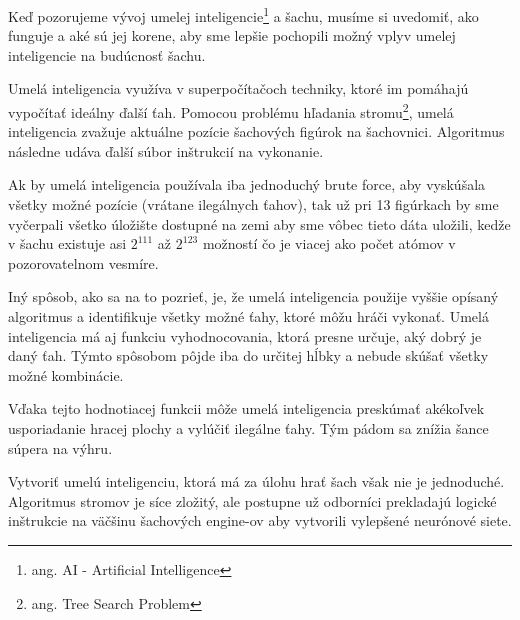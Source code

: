 \documentclass[10pt,oneside,slovak,a4paper]{article}
\begin{document}
Keď pozorujeme vývoj umelej inteligencie\footnote{ang. AI - Artificial Intelligence} a šachu, musíme si uvedomiť, ako funguje a aké sú jej korene, aby sme lepšie pochopili možný vplyv umelej inteligencie na budúcnosť šachu.

Umelá inteligencia využíva v superpočítačoch techniky, ktoré im pomáhajú vypočítať ideálny ďalší ťah. Pomocou problému hľadania stromu\footnote{ang. Tree Search Problem}, umelá inteligencia zvažuje aktuálne pozície šachových figúrok na šachovnici. Algoritmus následne udáva ďalší súbor inštrukcií na vykonanie.

Ak by umelá inteligencia používala iba jednoduchý brute force, aby vyskúšala všetky možné pozície (vrátane ilegálnych ťahov), tak už pri 13 figúrkach by sme vyčerpali všetko úložište dostupné na zemi aby sme vôbec tieto dáta uložili, kedže v šachu existuje asi $2^{111}$ až $2^{123}$ možností čo je viacej ako počet atómov v pozorovatelnom vesmíre.

Iný spôsob, ako sa na to pozrieť, je, že umelá inteligencia použije vyššie opísaný algoritmus a identifikuje všetky možné ťahy, ktoré môžu hráči vykonať. Umelá inteligencia má aj funkciu vyhodnocovania, ktorá presne určuje, aký dobrý je daný ťah. Týmto spôsobom pôjde iba do určitej hĺbky a nebude skúšať všetky možné kombinácie.

Vďaka tejto hodnotiacej funkcii môže umelá inteligencia preskúmať akékoľvek usporiadanie hracej plochy a vylúčiť ilegálne ťahy. Tým pádom sa znížia šance súpera na výhru.

Vytvoriť umelú inteligenciu, ktorá má za úlohu hrať šach však nie je jednoduché. Algoritmus stromov je síce zložitý, ale postupne už odborníci prekladajú logické inštrukcie na väčšinu šachových engine-ov aby vytvorili vylepšené neurónové siete.

\vspace*{\fill}
\end{document}
